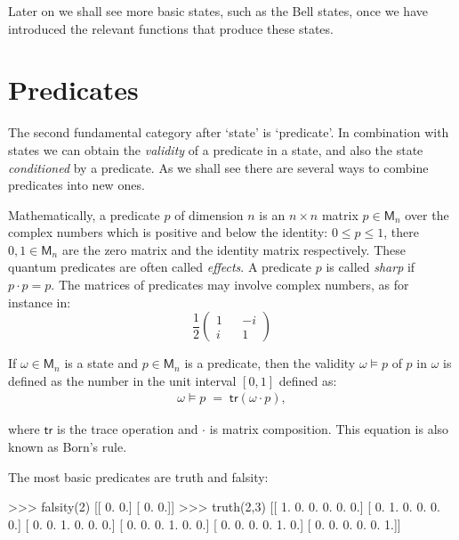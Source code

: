 \documentclass[leqno]{tufte-book} %
\newcommand{\Mat}{\mathsf{M}}
\newcommand{\tr}{\mathsf{tr}}
\begin{document}
\noindent Later on we shall see more basic states, such as the Bell
states, once we have introduced the relevant functions that produce
these states.



\section{Predicates}\label{sec:qpred}

The second fundamental category after `state' is
`predicate'. In combination with states we
can obtain the \emph{validity} of a predicate in a state, and also the
state \emph{conditioned} by a predicate. As we shall see there are
several ways to combine predicates into new ones.

Mathematically, a predicate $p$ of dimension $n$ is an $n\times n$
matrix $p\in\Mat_n$ over the complex numbers which is positive and
below the identity: $0 \leq p \leq 1$, there $0, 1 \in \Mat_{n}$ are
the zero matrix and the identity matrix respectively. These quantum
predicates are often called \emph{effects}. A predicate
$p$ is called
\emph{sharp}
if $p\cdot p = p$.  The matrices of predicates may involve complex
numbers, as for instance in:
$$\frac{1}{2}\left(\begin{array}{ccc}
1 & & -i
\\
i & & 1
\end{array}\right)$$

If $\omega\in\Mat_n$ is a state and $p\in\Mat_n$ is a predicate, then
the validity $\omega\models p$ of $p$ in $\omega$ is defined as the
number in the unit interval $[0,1]$ defined as:
\begin{equation}
\label{eqn:qvalidity}
\begin{array}{rcl}
\omega\models p
\;=\;
\tr(\omega\cdot p),
\end{array}
\end{equation}

\noindent where $\tr$ is the trace operation and $\cdot$ is matrix
composition. This equation is also known as Born's rule.

The most basic predicates are truth and falsity:
\begin{python}
>>> falsity(2)
[[ 0.  0.]
 [ 0.  0.]]
>>> truth(2,3)
[[ 1.  0.  0.  0.  0.  0.]
 [ 0.  1.  0.  0.  0.  0.]
 [ 0.  0.  1.  0.  0.  0.]
 [ 0.  0.  0.  1.  0.  0.]
 [ 0.  0.  0.  0.  1.  0.]
 [ 0.  0.  0.  0.  0.  1.]]
\end{python}
\end{document}
